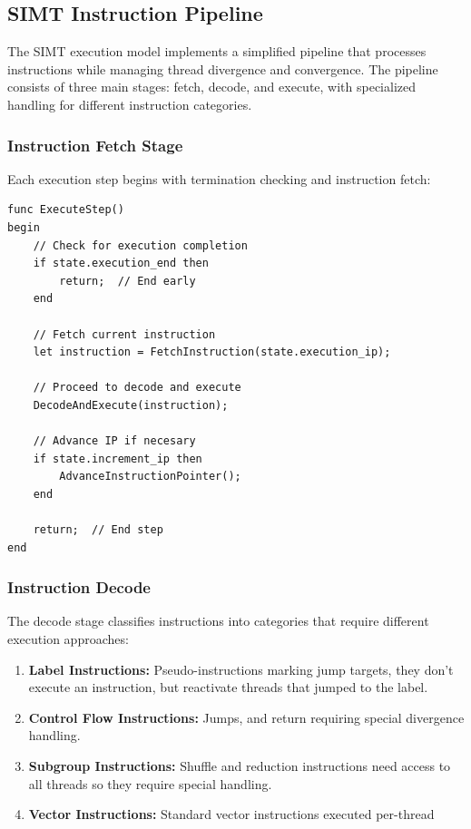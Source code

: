 \subsection{SIMT Instruction Pipeline}
\label{subsec:simt_pipeline}

The SIMT execution model implements a simplified pipeline that processes
instructions while managing thread divergence and convergence. The pipeline
consists of three main stages: fetch, decode, and execute, with specialized
handling for different instruction categories.

\subsubsection{Instruction Fetch Stage}
Each execution step begins with termination checking and instruction fetch:

\begin{lstlisting}[caption={Instruction Fetch Implementation}, label={lst:instruction_fetch}]
func ExecuteStep()
begin
    // Check for execution completion
    if state.execution_end then
        return;  // End early
    end
    
    // Fetch current instruction
    let instruction = FetchInstruction(state.execution_ip);
    
    // Proceed to decode and execute
    DecodeAndExecute(instruction);

    // Advance IP if necesary
    if state.increment_ip then
        AdvanceInstructionPointer();
    end
    
    return;  // End step
end
\end{lstlisting}

\subsubsection{Instruction Decode}
The decode stage classifies instructions into categories that require different
execution approaches:

\begin{enumerate}
    \item \textbf{Label Instructions:} Pseudo-instructions marking jump
    targets, they don't execute an instruction, but reactivate threads that
    jumped to the label.
    \item \textbf{Control Flow Instructions:} Jumps, and return requiring
    special divergence handling.
    \item \textbf{Subgroup Instructions:} Shuffle and reduction instructions
    need access to all threads so they require special handling.
    \item \textbf{Vector Instructions:} Standard vector instructions executed per-thread
\end{enumerate}

